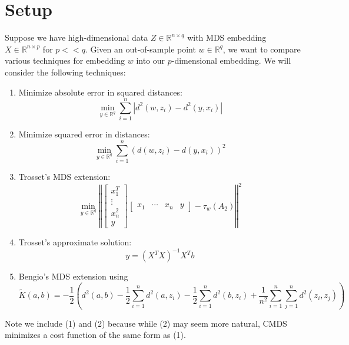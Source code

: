 \documentclass{article}
\begin{document}
\section{Setup}
Suppose we have high-dimensional data $Z \in \mathbb{R}^{n \times q}$ with MDS embedding $X \in \mathbb{R}^{n \times p}$ for $p << q$. Given an out-of-sample point $w \in \mathbb{R}^q$, we want to compare various techniques for embedding $w$ into our $p$-dimensional embedding. We will consider the following techniques:
\begin{enumerate}
	\item Minimize absolute error in squared distances: $$\min_{y \in \mathbb{R}^q} \sum_{i=1}^n \left| d^2(w, z_i) - d^2(y, x_i) \right|$$
	\item Minimize squared error in distances: $$\min_{y \in \mathbb{R}^q} \sum_{i=1}^n \left( d(w, z_i) - d(y, x_i) \right)^2$$
	\item Trosset's MDS extension: $$\min_{y \in \mathbb{R}^q} \left\Vert 
	\begin{bmatrix}
	x_1^T \\
	\vdots \\
	x_n^2 \\
	y
	\end{bmatrix}
	\begin{bmatrix}
	x_1 & \cdots & x_n & y
	\end{bmatrix}
	 - \tau_w(A_2)\right\Vert^2$$
	 \item Trosset's approximate solution: $$y = (X^TX)^{-1}X^Tb$$
	 \item Bengio's MDS extension using $$\tilde{K}(a,b) = -\frac{1}{2}\left( d^2(a,b) - \frac{1}{2}\sum_{i=1}^n d^2(a, z_i) - \frac{1}{2}\sum_{i=1}^n d^2(b, z_i) + \frac{1}{n^2} \sum_{i=1}^n \sum_{j=1}^n d^2(z_i, z_j)\right)$$
\end{enumerate}

\noindent Note we include (1) and (2) because while (2) may seem more natural, CMDS minimizes a cost function of the same form as (1).
\end{document}
